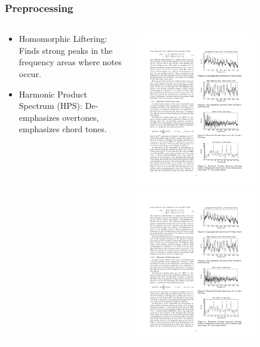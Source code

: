 \documentclass{beamer}
\begin{document}
\begin{frame}
	\frametitle{Preprocessing}
	\begin{columns}
	\begin{column}{.5\textwidth}
	\begin{itemize}
	\item Homomorphic Liftering: Finds strong peaks in the frequency areas where notes occur.
		\item Harmonic Product Spectrum (HPS): De-emphasizes overtones, emphasizes chord tones.
	\end{itemize}
	\end{column}
	\begin{column}{.5\textwidth}
	\includegraphics[width=0.70\textwidth]{freq.pdf} \\
	\includegraphics[width=0.70\textwidth]{freq2.pdf} \\

\end{column}
\end{columns}
\end{frame}
\end{document}

